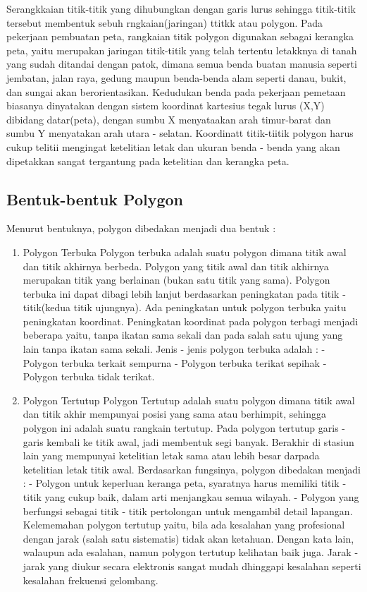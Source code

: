 Serangkkaian titik-titik yang dihubungkan dengan garis lurus sehingga titik-titik tersebut membentuk sebuh rngkaian(jaringan) ttitkk atau polygon. Pada pekerjaan pembuatan peta, rangkaian titik polygon digunakan sebagai  kerangka peta, yaitu merupakan jaringan titik-titik yang telah tertentu letakknya di tanah yang sudah ditandai dengan patok, dimana semua benda buatan manusia seperti jembatan, jalan raya, gedung maupun benda-benda alam seperti danau, bukit, dan sungai akan berorientasikan. Kedudukan benda pada pekerjaan pemetaan biasanya dinyatakan dengan sistem koordinat  kartesius tegak lurus (X,Y) dibidang datar(peta), dengan sumbu X menyataakan arah timur-barat dan sumbu Y menyatakan arah utara - selatan. Koordinatt titik-tiitik polygon harus cukup telitii mengingat ketelitian letak dan ukuran benda - benda yang akan dipetakkan sangat tergantung pada ketelitian dan kerangka peta.

\subsection{Bentuk-bentuk Polygon}
Menurut bentuknya, polygon dibedakan menjadi dua bentuk :
\begin{enumerate}
\item Polygon Terbuka
Polygon terbuka adalah suatu polygon dimana titik awal dan titik akhirnya berbeda. Polygon yang titik awal dan titik akhirnya merupakan titik yang berlainan (bukan satu titik yang sama). Polygon terbuka ini dapat dibagi lebih lanjut berdasarkan peningkatan pada titik - titik(kedua titik ujungnya). Ada peningkatan untuk polygon terbuka yaitu peningkatan koordinat. Peningkatan koordinat pada polygon terbagi menjadi beberapa yaitu, tanpa ikatan sama sekali dan pada salah satu ujung yang lain tanpa ikatan sama sekali. Jenis - jenis polygon terbuka adalah :
- Polygon terbuka terkait sempurna
- Polygon terbuka terikat sepihak
- Polygon terbuka tidak terikat.

\item Polygon Tertutup
Polygon Tertutup adalah suatu polygon dimana titik awal dan titik akhir mempunyai posisi yang sama atau berhimpit, sehingga polygon ini adalah suatu rangkain tertutup. Pada polygon tertutup garis - garis kembali ke titik awal, jadi membentuk segi banyak. Berakhir di stasiun lain yang mempunyai ketelitian letak sama atau lebih besar darpada ketelitian letak titik awal.
Berdasarkan fungsinya, polygon dibedakan menjadi :
- Polygon untuk keperluan keranga peta, syaratnya harus memiliki titik - titik yang cukup baik, dalam arti menjangkau semua wilayah.
- Polygon yang berfungsi sebagai titik - titik pertolongan untuk mengambil detail lapangan.
Kelememahan polygon tertutup yaitu, bila ada kesalahan yang profesional dengan jarak (salah  satu sistematis) tidak akan ketahuan. Dengan kata lain, walaupun ada esalahan, namun polygon tertutup kelihatan baik juga. Jarak - jarak yang diukur secara elektronis sangat mudah dhinggapi kesalahan seperti kesalahan frekuensi gelombang.
\end{enumerate}


